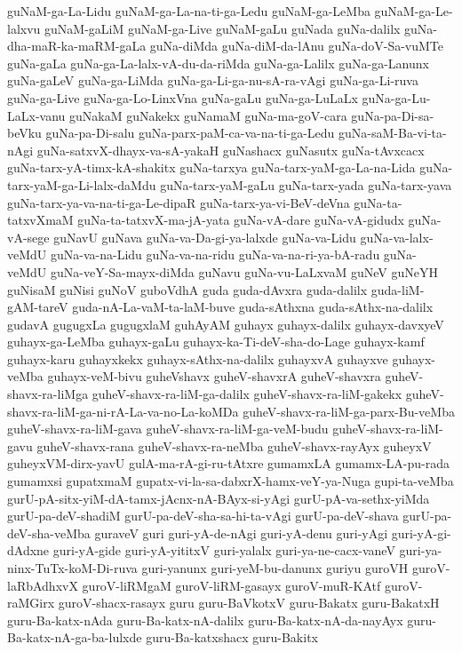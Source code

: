 {guNaM-ga-La-Lidu
guNaM-ga-La-na-ti-ga-Ledu
guNaM-ga-LeMba
guNaM-ga-Le-lalxvu
guNaM-gaLiM
guNaM-ga-Live
guNaM-gaLu
guNada
guNa-dalilx
guNa-dha-maR-ka-maRM-gaLa
guNa-diMda
guNa-diM-da-lAnu
guNa-doV-Sa-vuMTe
guNa-gaLa
guNa-ga-La-lalx-vA-du-da-riMda
guNa-ga-Lalilx
guNa-ga-Lanunx
guNa-gaLeV
guNa-ga-LiMda
guNa-ga-Li-ga-nu-sA-ra-vAgi
guNa-ga-Li-ruva
guNa-ga-Live
guNa-ga-Lo-LinxVna
guNa-gaLu
guNa-ga-LuLaLx
guNa-ga-Lu-LaLx-vanu
guNakaM
guNakekx
guNamaM
guNa-ma-goV-cara
guNa-pa-Di-sa-beVku
guNa-pa-Di-salu
guNa-parx-paM-ca-va-na-ti-ga-Ledu
guNa-saM-Ba-vi-ta-nAgi
guNa-satxvX-dhayx-va-sA-yakaH
guNashacx
guNasutx
guNa-tAvxcacx
guNa-tarx-yA-timx-kA-shakitx
guNa-tarxya
guNa-tarx-yaM-ga-La-na-Lida
guNa-tarx-yaM-ga-Li-lalx-daMdu
guNa-tarx-yaM-gaLu
guNa-tarx-yada
guNa-tarx-yava
guNa-tarx-ya-va-na-ti-ga-Le-dipaR
guNa-tarx-ya-vi-BeV-deVna
guNa-ta-tatxvXmaM
guNa-ta-tatxvX-ma-jA-yata
guNa-vA-dare
guNa-vA-gidudx
guNa-vA-sege
guNavU
guNava
guNa-va-Da-gi-ya-lalxde
guNa-va-Lidu
guNa-va-lalx-veMdU
guNa-va-na-Lidu
guNa-va-na-ridu
guNa-va-na-ri-ya-bA-radu
guNa-veMdU
guNa-veY-Sa-mayx-diMda
guNavu
guNa-vu-LaLxvaM
guNeV
guNeYH
guNisaM
guNisi
guNoV
guboVdhA
guda
guda-dAvxra
guda-dalilx
guda-liM-gAM-tareV
guda-nA-La-vaM-ta-laM-buve
guda-sAthxna
guda-sAthx-na-dalilx
gudavA
gugugxLa
gugugxlaM
guhAyAM
guhayx
guhayx-dalilx
guhayx-davxyeV
guhayx-ga-LeMba
guhayx-gaLu
guhayx-ka-Ti-deV-sha-do-Lage
guhayx-kamf
guhayx-karu
guhayxkekx
guhayx-sAthx-na-dalilx
guhayxvA
guhayxve
guhayx-veMba
guhayx-veM-bivu
guheVshavx
guheV-shavxrA
guheV-shavxra
guheV-shavx-ra-liMga
guheV-shavx-ra-liM-ga-dalilx
guheV-shavx-ra-liM-gakekx
guheV-shavx-ra-liM-ga-ni-rA-La-va-no-La-koMDa
guheV-shavx-ra-liM-ga-parx-Bu-veMba
guheV-shavx-ra-liM-gava
guheV-shavx-ra-liM-ga-veM-budu
guheV-shavx-ra-liM-gavu
guheV-shavx-rana
guheV-shavx-ra-neMba
guheV-shavx-rayAyx
guheyxV
guheyxVM-dirx-yavU
gulA-ma-rA-gi-ru-tAtxre
gumamxLA
gumamx-LA-pu-rada
gumamxsi
gupatxmaM
gupatx-vi-la-sa-dabxrX-hamx-veY-ya-Nuga
gupi-ta-veMba
gurU-pA-sitx-yiM-dA-tamx-jAcnx-nA-BAyx-si-yAgi
gurU-pA-va-sethx-yiMda
gurU-pa-deV-shadiM
gurU-pa-deV-sha-sa-hi-ta-vAgi
gurU-pa-deV-shava
gurU-pa-deV-sha-veMba
guraveV
guri
guri-yA-de-nAgi
guri-yA-denu
guri-yAgi
guri-yA-gi-dAdxne
guri-yA-gide
guri-yA-yititxV
guri-yalalx
guri-ya-ne-cacx-vaneV
guri-ya-ninx-TuTx-koM-Di-ruva
guri-yanunx
guri-yeM-bu-danunx
guriyu
guroVH
guroV-laRbAdhxvX
guroV-liRMgaM
guroV-liRM-gasayx
guroV-muR-KAtf
guroV-raMGirx
guroV-shacx-rasayx
guru
guru-BaVkotxV
guru-Bakatx
guru-BakatxH
guru-Ba-katx-nAda
guru-Ba-katx-nA-dalilx
guru-Ba-katx-nA-da-nayAyx
guru-Ba-katx-nA-ga-ba-lulxde
guru-Ba-katxshacx
guru-Bakitx
}
